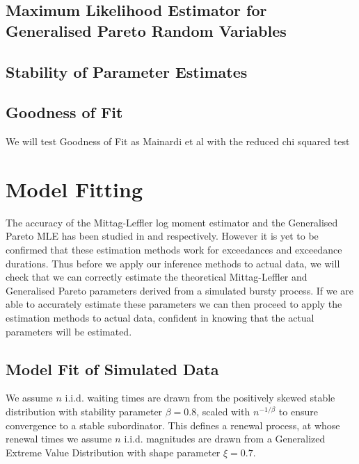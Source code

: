 \documentclass[honours,12pt]{UNSWthesis}
\newcommand{\1}{\mathbf 1}
\numberwithin{equation}{section}
\theoremstyle{definition}
\theoremstyle{remark}
\begin{document}
\section{Maximum Likelihood Estimator for Generalised Pareto Random Variables}
\section{Stability of Parameter Estimates}
\section{Goodness of Fit}%
We will test Goodness of Fit as Mainardi et al with the reduced chi squared test
\chapter{Model Fitting}
The accuracy of the Mittag-Leffler log moment estimator and the Generalised Pareto MLE has been studied 
in \cite{Cahoy2013} and \cite{GPaccuracyCitation} respectively. However it is yet to be confirmed that these estimation methods work for exceedances and exceedance durations. Thus before we apply our inference methods to actual data, we will check that we can correctly estimate the theoretical Mittag-Leffler and Generalised Pareto parameters derived from a simulated bursty process. If we are able to accurately estimate these parameters we can then proceed to apply the estimation methods to actual data, confident in knowing that the actual parameters will be estimated.

\section{Model Fit of Simulated Data}
We assume $n$ i.i.d. waiting times are drawn from the positively skewed stable
distribution with stability parameter $\beta=0.8$, scaled with 
$n^{-1/\beta}$ to ensure convergence to a stable subordinator. This defines a renewal process, at whose renewal times we assume $n$ i.i.d. magnitudes are drawn from a Generalized Extreme Value Distribution
with shape parameter $\xi = 0.7$.
	
\end{document}
